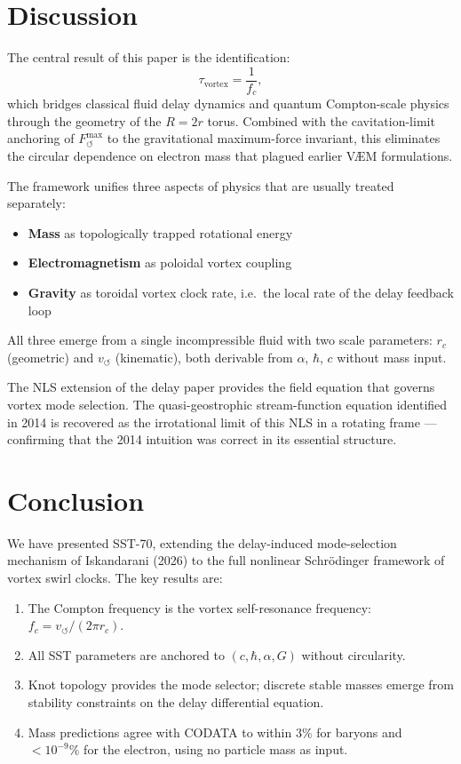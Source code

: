 \documentclass[11pt,a4paper]{article}
\begin{document}
\section{Discussion}

The central result of this paper is the identification:
\[
  \tau_\text{vortex} = \frac{1}{f_c},
\]
which bridges classical fluid delay dynamics and quantum Compton-scale physics
through the geometry of the $R = 2r$ torus. Combined with the cavitation-limit
anchoring of $F_{\circlearrowleft}^{\max}$ to the gravitational maximum-force
invariant, this eliminates the circular dependence on electron mass that plagued
earlier VÆM formulations.

The framework unifies three aspects of physics that are usually treated separately:
\begin{itemize}
  \item \textbf{Mass} as topologically trapped rotational energy
  \item \textbf{Electromagnetism} as poloidal vortex coupling
  \item \textbf{Gravity} as toroidal vortex clock rate, i.e.\ the local rate of
        the delay feedback loop
\end{itemize}
All three emerge from a single incompressible fluid with two scale parameters:
$r_c$ (geometric) and $v_{\circlearrowleft}$ (kinematic), both derivable from $\alpha$,
$\hbar$, $c$ without mass input.

The NLS extension of the delay paper \cite{Iskandarani2026AIP} provides the field
equation that governs vortex mode selection. The quasi-geostrophic stream-function
equation identified in 2014 \cite{Iskandarani2014VAM} is recovered as the
irrotational limit of this NLS in a rotating frame --- confirming that the 2014
intuition was correct in its essential structure.

\section{Conclusion}

We have presented SST-70, extending the delay-induced mode-selection mechanism of
Iskandarani (2026) to the full nonlinear Schr\"{o}dinger framework of vortex swirl
clocks. The key results are:

\begin{enumerate}
  \item The Compton frequency is the vortex self-resonance frequency:
        $f_c = v_{\circlearrowleft}/(2\pi r_c)$.
  \item All SST parameters are anchored to $(c, \hbar, \alpha, G)$ without
        circularity.
  \item Knot topology provides the mode selector; discrete stable masses emerge
        from stability constraints on the delay differential equation.
  \item Mass predictions agree with CODATA to within $3\%$ for baryons and
        $< 10^{-9}\%$ for the electron, using no particle mass as input.
\end{enumerate}
\end{document}
